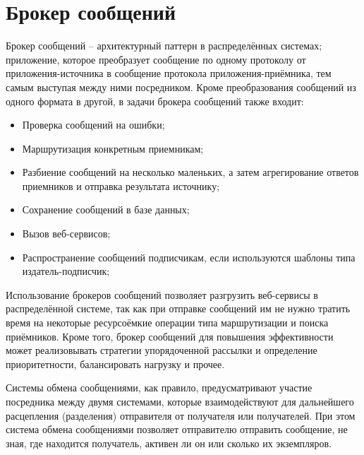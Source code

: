 \section{Брокер сообщений}
Брокер сообщений -- архитектурный паттерн в распределённых системах; приложение,
которое преобразует сообщение по одному протоколу от приложения-источника в
сообщение протокола приложения-приёмника, тем самым выступая между ними
посредником. Кроме преобразования сообщений из одного формата в другой, в задачи
брокера сообщений также входит:
\begin{itemize}
    \item Проверка сообщений на ошибки;
    \item Маршрутизация конкретным приемникам;
    \item Разбиение сообщений на несколько маленьких, а затем агрегирование ответов приемников и отправка результата источнику;
    \item Сохранение сообщений в базе данных;
    \item Вызов веб-сервисов;
    \item Распространение сообщений подписчикам, если используются шаблоны типа издатель-подписчик;
\end{itemize}

Использование брокеров сообщений позволяет разгрузить веб-сервисы в
распределённой системе, так как при отправке сообщений им не нужно тратить время
на некоторые ресурсоёмкие операции типа маршрутизации и поиска приёмников. Кроме
того, брокер сообщений для повышения эффективности может реализовывать стратегии
упорядоченной рассылки и определение приоритетности, балансировать нагрузку и
прочее.

Системы обмена сообщениями, как правило, предусматривают участие посредника
между двумя системами, которые взаимодействуют для дальнейшего расцепления
(разделения) отправителя от получателя или получателей. При этом система обмена
сообщениями позволяет отправителю отправить сообщение, не зная, где находится
получатель, активен ли он или сколько их экземпляров.

